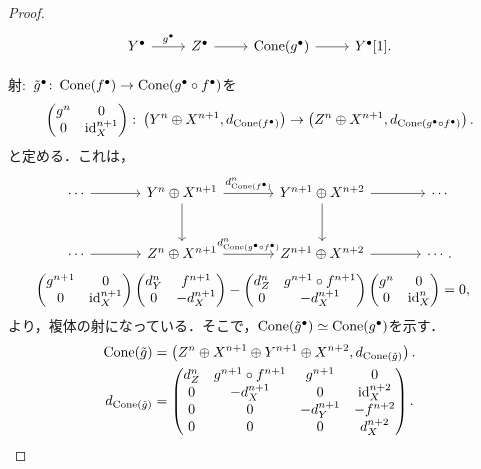 \begin{proof}
\[\begin{tikzcd}[row sep=5pt]
			Y^\bullet \ar[r,"g^\bullet"]& Z^\bullet\ar[r]& \Cone(g^\bullet) \ar[r]& Y^\bullet[1].\\
		\end{tikzcd}
			\]
			射:\ $\tilde{g}^\bullet\colon \operatorname{\mathrm{Cone}}(f^\bullet)\rightarrow \operatorname{\mathrm{Cone}}(g^\bullet\circ f^\bullet)$を
			\[\begin{pmatrix}g^n & 0 \\ 0 & \mathrm{id}_X^{n+1}\end{pmatrix}\colon \left(Y^n\oplus X^{n+1}, d_{\operatorname{\mathrm{Cone}}(f^\bullet)}\right)\rightarrow \left(Z^n\oplus X^{n+1}, d_{\operatorname{\mathrm{Cone}}(g^\bullet\circ f^\bullet)}\right). \]
			と定める．これは，
		\[
\begin{tikzcd}[column sep=large, row sep=large]
  \cdots \ar[r] &
	Y^{n}\oplus X^{n+1} \ar[r,"d_{\Cone(f^\bullet)}^{n}"] \ar[d,] &Y^{n+1}\oplus X^{n+2} \ar[r] \ar[d,] &
  \cdots \\
  \cdots \ar[r] &
	Z^{n}\oplus X^{n+1} \ar[r,"d_{\Cone(g^\bullet\circ f^\bullet)}^{n}"] &Z^{n+1}\oplus X^{n+2} \ar[r] &
	\cdots .
\end{tikzcd}
	\]
			\begin{align*}
				\begin{pmatrix}g^{n+1} & 0\\ 0 & \mathrm{id}_X^{n+1}\end{pmatrix}\begin{pmatrix}d^n_Y & f^{n+1}\\ 0 & -d_X^{n+1}\end{pmatrix} - \begin{pmatrix}d^{n}_Z & g^{n+1}\circ f^{n+1}\\ 0 & -d_X^{n+1}\end{pmatrix}\begin{pmatrix}g^{n} & 0\\ 0 & \mathrm{id}_X^{n}\end{pmatrix} &= 0,
			\end{align*}
より，複体の射になっている．そこで，$\operatorname{\mathrm{Cone}}(\tilde{g}^\bullet)\simeq \operatorname{\mathrm{Cone}}(g^\bullet)$を示す．
			\begin{gather*}
				\Cone(\tilde{g}) = \left(Z^n\oplus X^{n+1}\oplus Y^{n+1}\oplus X^{n+2},d_{\Cone(\tilde{g})}\right).\\
				d_{\Cone(\tilde{g})}= \begin{pmatrix}d_Z^n & g^{n+1}\circ f^{n+1} & g^{n+1}& 0\\
0 & -d_X^{n+1}& 0 & \id^{n+2}_{X}\\
0 & 0 & -d_Y^{n+1} & -f^{n+2}\\
0 & 0 & 0 & d_X^{n+2}\end{pmatrix}.

\end{gather*}
\end{proof}
